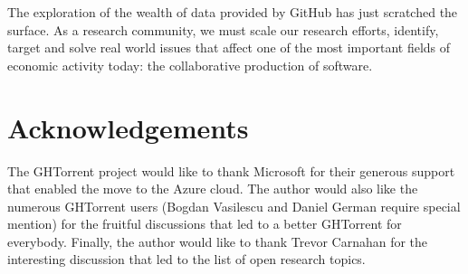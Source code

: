 \documentclass{sig-alternate}
\begin{document}
The exploration of the wealth of data provided by GitHub has just scratched the
surface. As a research community, we must scale our research efforts, identify,
target and solve real world issues that affect one of the most important fields
of economic activity today: the collaborative production of software.

\section*{Acknowledgements}

The GHTorrent project would like to thank Microsoft for their generous support
that enabled the move to the Azure cloud. The author would also like the
numerous GHTorrent users (Bogdan Vasilescu and Daniel German require special
mention) for the fruitful discussions that led to a better GHTorrent for
everybody. Finally, the author would like to thank Trevor Carnahan for
the interesting discussion that led to the list of open research topics.



\end{document}
